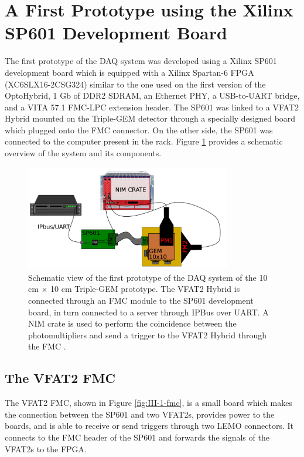   \section{A First Prototype using the Xilinx SP601 Development Board}
  \label{sec:III-1-sp601}

    The first prototype of the DAQ system was developed using a Xilinx SP601 development board which is equipped with a Xilinx Spartan-6 FPGA (XC6SLX16-2CSG324) similar to the one used on the first version of the OptoHybrid, 1 Gb of DDR2 SDRAM, an Ethernet PHY, a USB-to-UART bridge, and a VITA 57.1 FMC-LPC extension header. The SP601 was linked to a VFAT2 Hybrid mounted on the Triple-GEM detector through a specially designed board which plugged onto the FMC connector. On the other side, the SP601 was connected to the computer present in the rack. Figure \ref{fig:III-1-sys-1} provides a schematic overview of the system and its components.

    \begin{figure}[t!]
      \centering
      \includegraphics[width=0.8\textwidth]{img/III-1-arch/sys_1.png}
      \caption{Schematic view of the first prototype of the DAQ system of the 10 cm $ \times $ 10 cm Triple-GEM prototype. The VFAT2 Hybrid is connected through an FMC module to the SP601 development board, in turn connected to a server through IPBus over UART. A NIM crate is used to perform the coincidence between the photomultipliers and send a trigger to the VFAT2 Hybrid through the FMC \cite{Leonard:2065693}.}
      \label{fig:III-1-sys-1}
    \end{figure}

    \subsection{The VFAT2 FMC}

      The VFAT2 FMC, shown in Figure \ref{fig:III-1-fmc}, is a small board which makes the connection between the SP601 and two VFAT2s, provides power to the boards, and is able to receive or send triggers through two LEMO connectors. It connects to the FMC header of the SP601 and forwards the signals of the VFAT2s to the FPGA.

